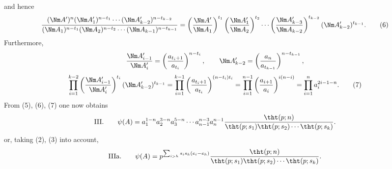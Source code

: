and hence
\begin{equation}
 { (\Nm A')^n(\Nm A_1')^{n-t_1}\cdots(\Nm A_{k-2}')^{n-t_{k-2}}
 \over
 (\Nm A_1)^{n-t_1}(\Nm A_2)^{n-t_2}\cdots(\Nm A_{k-1})^{n-t_{k-1}} }
 =\left({\Nm A'\over\Nm A_1}\right)^{t_1}
 \left({\Nm A_1'\over\Nm A_2}\right)^{t_2}
 \cdots
 \left({\Nm A_{k-3}'\over\Nm A_{k-2}}\right)^{t_{k-2}}
 (\Nm A_{k-2}')^{t_{k-1}}.
\tag{6}
\end{equation}
Furthermore,
\[
 {\Nm A_{i-1}'\over\Nm A_i'}=\left({a_{t_i+1}\over a_{t_i}}\right)^{n-t_i},
 \qquad
 \Nm A_{k-2}'=\left({a_n\over a_{t_{k-1}}}\right)^{n-t_{k-1}},
\]
\begin{equation}
 \prod_{i=1}^{k-2}\left({\Nm A_{i-1}'\over\Nm A_i'}\right)^{t_i}
 (\Nm A_{k-2}')^{t_{k-1}}
 =\prod_{i=1}^{k-1}\left({a_{t_i+1}\over a_{t_i}}\right)^{(n-t_i)t_i}
 =\prod_{i=1}^{n-1}\left({a_{i+1}\over a_i}\right)^{i(n-i)}
 =\prod_{i=1}^n a_i^{2i-1-n}.
\tag{7}
\end{equation}
From (5), (6), (7) one now obtains
\[
\text{III.}\qquad
 \psi(A)=a_1^{1-n}a_2^{3-n}a_3^{5-n}\cdots a_{n-1}^{n-3}a_n^{n-1}
 {\tht(p;n)\over\tht(p;s_1)\tht(p;s_2)\cdots\tht(p;s_k)}.
\]
or, taking (2), (3) into account,
\[
\text{IIIa.}\qquad
 \psi(A)=p^{\sum_{i>h}s_i s_h(e_i-e_h)}
 {\tht(p;n)\over\tht(p;s_1)\tht(p;s_2)\cdots\tht(p;s_k)}.
\]

